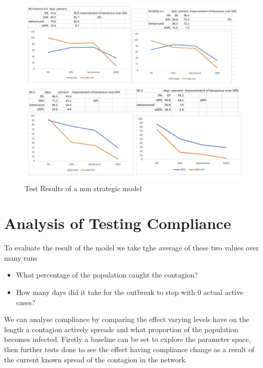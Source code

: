 \documentclass{article}
\begin{document}
\newpage

\begin{figure}
  \centering
      \includegraphics[width=\textwidth]{basicgraph}
  \caption{Test Results of a non strategic model}
\end{figure}



\section{Analysis of Testing Compliance}

To evaluate the result of the model we take tghe average of these two values over many runs 
\begin{itemize}
\item What percentage of the population caught the contagion?
\item How many days did it take for the outbreak to stop with 0 actual active cases?
\end{itemize}

We can analyse compliance by comparing the effect varying levels have on the length a contagion actively spreads and what proportion of the population becomes infected. Firstly a baseline can be set to explore the parameter space, then further tests done to see the effect having compliance change as a result of the current known spread of the contagion in the network.
\end{document}
